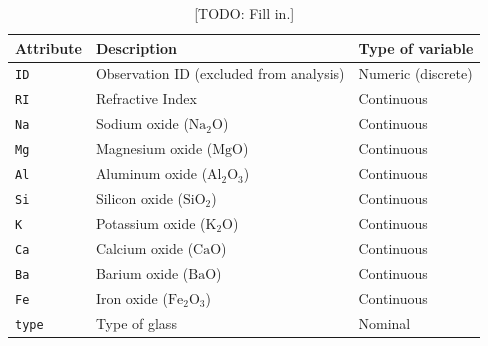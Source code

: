\documentclass[dtu]{dtuarticle}
\newcommand{\todo}[1]{\color{red}[TODO: #1]\color{black}}
\newcommand*\chem[1]{\ensuremath{\mathrm{#1}}}
\begin{document}
	\begin{table}
		\centering
		\begin{tabular}{l|l|l}
			\textbf{Attribute} & \textbf{Description}                    & \textbf{Type of variable} \\ \hline \hline
			\texttt{ID}        & Observation ID (excluded from analysis) & Numeric (discrete)        \\ \hline
			\texttt{RI}        & Refractive Index                        & Continuous                \\ \hline
			\texttt{Na}        & Sodium oxide ($\chem{Na_2 O}$)          & Continuous                \\ \hline
			\texttt{Mg}        & Magnesium oxide ($\chem{Mg O}$)         & Continuous                \\ \hline
			\texttt{Al}        & Aluminum oxide ($\chem{Al_2 O_3}$)      & Continuous                \\ \hline
			\texttt{Si}        & Silicon oxide ($\chem{Si O_2}$)         & Continuous                \\ \hline
			\texttt{K}         & Potassium oxide ($\chem{K_2 O}$)        & Continuous                \\ \hline
			\texttt{Ca}        & Calcium oxide ($\chem{Ca O }$)          & Continuous                \\ \hline
			\texttt{Ba}        & Barium oxide ($\chem{Ba O}$)            & Continuous                \\ \hline
			\texttt{Fe}        & Iron oxide ($\chem{Fe_2 O_3}$)          & Continuous                \\ \hline
			\texttt{type}      & Type of glass                           & Nominal                   \\
		\end{tabular}
		\caption{\todo{Fill in.}}
		\label{table:attributes}
	\end{table}
\end{document}

